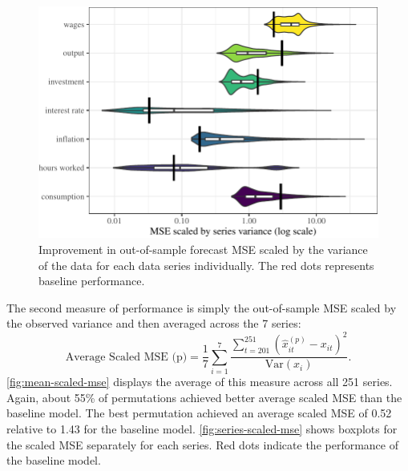 \documentclass[11pt]{article}
\renewcommand{\hat}{\widehat}
\begin{document}
\begin{figure}[t]

{\centering \includegraphics{gfx/series-scaled-mse-1} 

}

\caption{Improvement in out-of-sample forecast MSE scaled by the variance of the data for each data series individually. The red dots represents baseline performance.}\label{fig:series-scaled-mse}
\end{figure}

The second measure of performance is simply the out-of-sample MSE scaled
by the observed variance and then averaged across the 7 series:
\begin{equation}
  \mbox{Average Scaled MSE (p)} = \frac{1}{7} \sum_{i=1}^7
  \frac{\sum_{t=201}^{251} (\hat{x}_{it}^{(p)}-x_{it})^2}
    {\mbox{Var}(x_i)}.
\end{equation} \autoref{fig:mean-scaled-mse} displays the average of
this measure across all 251 series. Again, about 55\% of permutations
achieved better average scaled MSE than the baseline model. The best
permutation achieved an average scaled MSE of 0.52 relative to 1.43 for
the baseline model. \autoref{fig:series-scaled-mse} shows boxplots for
the scaled MSE separately for each series. Red dots indicate the
performance of the baseline model.
\end{document}
